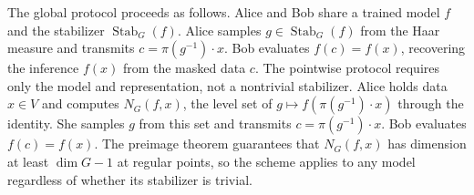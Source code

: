 \documentclass[11pt]{article}
\DeclareMathOperator{\Stab}{Stab}
\begin{document}
The global protocol proceeds as follows. Alice and Bob share a trained model $f$ and the stabilizer $\Stab_G(f)$. Alice samples $g \in \Stab_G(f)$ from the Haar measure and transmits $c = \pi(g^{-1}) \cdot x$. Bob evaluates $f(c) = f(x)$, recovering the inference $f(x)$ from the masked data $c$. The pointwise protocol requires only the model and representation, not a nontrivial stabilizer. Alice holds data $x \in V$ and computes $N_G(f, x)$, the level set of $g \mapsto f(\pi(g^{-1}) \cdot x)$ through the identity. She samples $g$ from this set and transmits $c = \pi(g^{-1}) \cdot x$. Bob evaluates $f(c) = f(x)$. The preimage theorem guarantees that $N_G(f,x)$ has dimension at least $\dim G - 1$ at regular points, so the scheme applies to any model regardless of whether its stabilizer is trivial.

\end{document}
